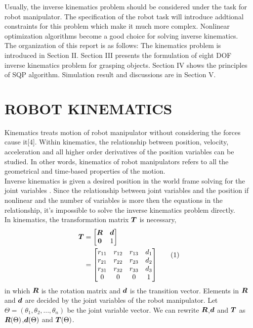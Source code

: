 \documentclass[journal,comsoc]{IEEEtran}
\begin{document}
Usually, the inverse kinematics problem should be considered under the task for robot manipulator. The specification of the robot task will introduce addtional constraints for this problem which make  it much more complex. Nonlinear optimization algorithms become a good choice for solving inverse kinematics. \\

The organization of this report is as follows: The kinematics problem is introduced in Section II. Section III presents the formulation of eight DOF inverse kinematics problem for grasping objects. Section IV shows the principles of SQP algorithm. Simulation result and discussions are  in Section V.  




\section{ROBOT KINEMATICS}
Kinematics treats motion of robot manipulator without considering the forces cause it[4]. Within kinematics, the relationship between position, velocity, acceleration and all higher order derivatives of the position variables can be studied. In other words, kinematics of robot manipulators refers to all the geometrical and time-based properties of the motion. \\

Inverse kinematics is given a desired position in the world frame solving for the joint variables . Since the relationship between joint variables and the position if nonlinear and the number of variables is more then the equations in the relationship, it's impossible to solve the inverse kinematics problem directly. \\

In kinematics, the transformation matrix $\mbox{\boldmath $T$}$ is necessary, 
\[
\begin{split}
\mbox{\boldmath $T$} &= 
  \left[
  \begin{matrix}
  \mbox{\boldmath $R$} & \mbox{\boldmath $d$} \\
  \mbox{\boldmath $0$}& 1	
  \end{matrix}	
  \right] \\
  &=
  \left[
  \begin{matrix}
  r_{11} & r_{12} & r_{13} & d_1 \\
  r_{21} & r_{22} & r_{23} & d_2 \\
  r_{31} & r_{32} & r_{33} & d_3 \\
  0 & 0 & 0 & 1	
  \end{matrix} 
  \right] 
  \end{split} \tag{1}
\] 
in which $\mbox{\boldmath $R$}$ is the rotation matrix and $\mbox{\boldmath $d$}$ is the transition vector. Elements in $\mbox{\boldmath $R$}$ and $\mbox{\boldmath $d$}$ are decided by the joint variables of the robot manipulator. Let $\Theta = (\theta_1, \theta_2, ..., \theta_n)$ be the joint variable vector. We can rewrite $\mbox{\boldmath $R$}$,$\mbox{\boldmath $d$}$ and $\mbox{\boldmath $T$}$ as $\mbox{\boldmath $R$}(\Theta)$,$\mbox{\boldmath $d$}(\Theta)$ and $\mbox{\boldmath $T$}(\Theta)$.  \\
\end{document}
